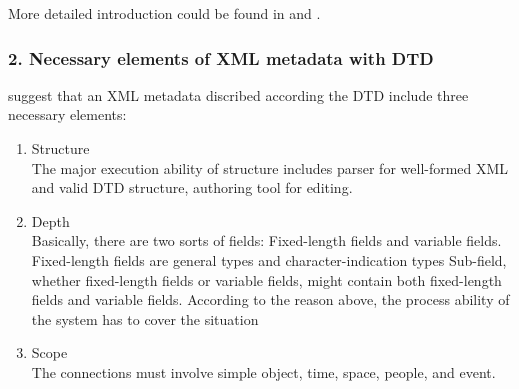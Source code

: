 More detailed introduction could be found in {\bf\cite{1:1:1}} and {\bf\cite{Rachel:2009:reviewofmetadataformats}}.


\subsubsection*{2. Necessary elements of XML metadata with DTD}
\label{sec:mets}
{\bf\cite{Ruey-Shun:2003:DevelopinganXMLframeworkformetadatasystem}} suggest that an XML metadata discribed according the DTD include three necessary elements:
\begin{enumerate}
	\item Structure\\
	The major execution ability of structure includes parser for well-formed XML and
	valid DTD structure, authoring tool for editing.
	
	\item Depth\\
	Basically, there are two sorts of fields: Fixed-length fields and variable fields.
	Fixed-length fields are general types and character-indication types Sub-field, whether
	fixed-length fields or variable fields, might contain both fixed-length fields and
	variable fields. According to the reason above, the process ability of the system has to
	cover the situation
	
	\item Scope\\
	The connections must involve simple object, time, space, people, and event. 
\end{enumerate}



